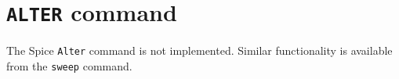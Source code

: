 %
%
%
%
\section{{\tt ALTER} command}
The Spice {\tt Alter} command is not implemented.  Similar functionality is
available from the {\tt sweep} command.
